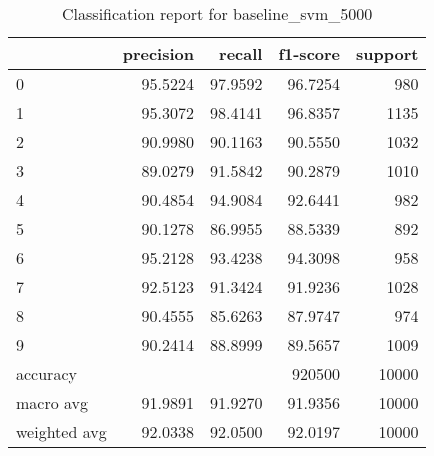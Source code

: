 \begin{table}[htb!]
\centering
\begin{tabular}{lrrrr}
    \toprule
    & precision & recall & f1-score & support \\
    \midrule
0 & 95.5224 & 97.9592 & 96.7254 & 980 \\
1 & 95.3072 & 98.4141 & 96.8357 & 1135 \\
2 & 90.9980 & 90.1163 & 90.5550 & 1032 \\
3 & 89.0279 & 91.5842 & 90.2879 & 1010 \\
4 & 90.4854 & 94.9084 & 92.6441 & 982 \\
5 & 90.1278 & 86.9955 & 88.5339 & 892 \\
6 & 95.2128 & 93.4238 & 94.3098 & 958 \\
7 & 92.5123 & 91.3424 & 91.9236 & 1028 \\
8 & 90.4555 & 85.6263 & 87.9747 & 974 \\
9 & 90.2414 & 88.8999 & 89.5657 & 1009 \\
accuracy & & & 920500 & 10000 \\
macro avg & 91.9891 & 91.9270 & 91.9356 & 10000 \\
weighted avg & 92.0338 & 92.0500 & 92.0197 & 10000 \\
\bottomrule
\end{tabular}
\caption{Classification report for baseline\_svm\_5000}
\label{tab:classification-report-baseline_svm_5000}
\end{table}
